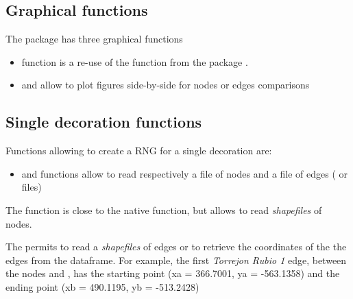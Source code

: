 \documentclass[article]{jss}\usepackage{knitr}
\begin{document}
\subsection{Graphical functions} \label{sec:functions_gr}

The  package has three graphical functions
\begin{itemize}
\setlength\itemsep{.1em}
\item {} function is a re-use of the  function from the  package \citep{Snow20}.
\item {} and  allow to plot figures side-by-side for nodes or edges comparisons
\end{itemize}

\subsection{Single decoration functions} \label{sec:functions_one}

Functions allowing to create a RNG for a single decoration are:

\begin{itemize}
\setlength\itemsep{.1em}
  \item {} and  functions allow to read respectively a file of nodes and a file of edges ( or  files)
\end{itemize}

The  function is close to the  native  function, but allows to read \emph{shapefiles} of nodes.

The  permits to read a \emph{shapefiles} of edges or to retrieve the coordinates of the the edges from the  dataframe. For example, the first \emph{Torrejon Rubio 1} edge, between the nodes  and , has the starting point (xa = 366.7001, ya = -563.1358) and the ending point (xb = 490.1195, yb = -513.2428)
\end{document}
